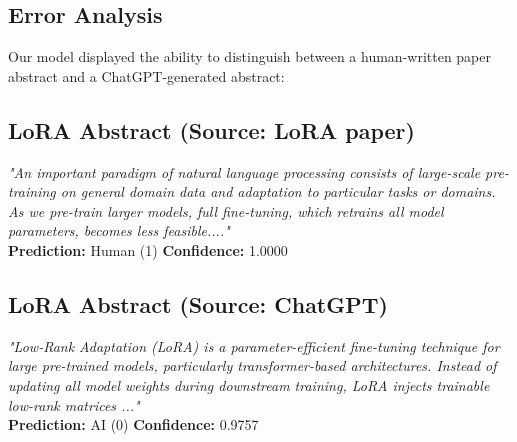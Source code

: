 \documentclass[11pt]{article}
\begin{document}
\begin{table}[ht]
\centering
\caption{Report for \texttt{reddit\_cohere.jsonl}}
\label{tab:reddit_cohere}
\end{table}


\subsection{Error Analysis}
\label{sec:error_analysis}

Our model displayed the ability to distinguish between a human-written paper abstract and a ChatGPT-generated abstract:

\subsection*{LoRA Abstract (Source: LoRA paper)}
\noindent
\textit{"An important paradigm of natural language processing consists of large-scale pre-training on general domain data and adaptation to particular tasks or domains. As we pre-train larger models, full fine-tuning, which retrains all model parameters, becomes less feasible...."} \\
\textbf{Prediction:} Human (1) \quad \textbf{Confidence:} 1.0000

\subsection*{LoRA Abstract (Source: ChatGPT)}
\noindent
\textit{"Low-Rank Adaptation (LoRA) is a parameter-efficient fine-tuning technique for large pre-trained models, particularly transformer-based architectures. Instead of updating all model weights during downstream training, LoRA injects trainable low-rank matrices ..."} \\
\textbf{Prediction:} AI (0) \quad \textbf{Confidence:} 0.9757
\end{document}
